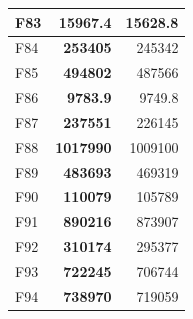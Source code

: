 \begin{table}[]
\begin{tabular}{lrr|}
\multicolumn{1}{|l|}{\cellcolor[HTML]{FCE6AB}F83} & \multicolumn{1}{r|}{\cellcolor[HTML]{D3FFB6}\textbf{15967.4}} & 15628.8                                                   \\ \hline
\multicolumn{1}{|l|}{\cellcolor[HTML]{FCE6AB}F84} & \multicolumn{1}{r|}{\cellcolor[HTML]{D3FFB6}\textbf{253405}}  & 245342                                                    \\ \hline
\multicolumn{1}{|l|}{\cellcolor[HTML]{FCE6AB}F85} & \multicolumn{1}{r|}{\cellcolor[HTML]{D3FFB6}\textbf{494802}}  & 487566                                                    \\ \hline
\multicolumn{1}{|l|}{\cellcolor[HTML]{FCE6AB}F86} & \multicolumn{1}{r|}{\cellcolor[HTML]{D3FFB6}\textbf{9783.9}}  & 9749.8                                                    \\ \hline
\multicolumn{1}{|l|}{\cellcolor[HTML]{FCE6AB}F87} & \multicolumn{1}{r|}{\cellcolor[HTML]{D3FFB6}\textbf{237551}}  & 226145                                                    \\ \hline
\multicolumn{1}{|l|}{\cellcolor[HTML]{FCE6AB}F88} & \multicolumn{1}{r|}{\cellcolor[HTML]{D3FFB6}\textbf{1017990}} & 1009100                                                   \\ \hline
\multicolumn{1}{|l|}{\cellcolor[HTML]{FCE6AB}F89} & \multicolumn{1}{r|}{\cellcolor[HTML]{D3FFB6}\textbf{483693}}  & 469319                                                    \\ \hline
\multicolumn{1}{|l|}{\cellcolor[HTML]{FCE6AB}F90} & \multicolumn{1}{r|}{\cellcolor[HTML]{D3FFB6}\textbf{110079}}  & 105789                                                    \\ \hline
\multicolumn{1}{|l|}{\cellcolor[HTML]{FCE6AB}F91} & \multicolumn{1}{r|}{\cellcolor[HTML]{D3FFB6}\textbf{890216}}  & 873907                                                    \\ \hline
\multicolumn{1}{|l|}{\cellcolor[HTML]{FCE6AB}F92} & \multicolumn{1}{r|}{\cellcolor[HTML]{D3FFB6}\textbf{310174}}  & 295377                                                    \\ \hline
\multicolumn{1}{|l|}{\cellcolor[HTML]{FCE6AB}F93} & \multicolumn{1}{r|}{\cellcolor[HTML]{D3FFB6}\textbf{722245}}  & 706744                                                    \\ \hline
\multicolumn{1}{|l|}{\cellcolor[HTML]{FCE6AB}F94} & \multicolumn{1}{r|}{\cellcolor[HTML]{D3FFB6}\textbf{738970}}  & 719059                                                    \\ \hline

\end{tabular}
\end{table}

